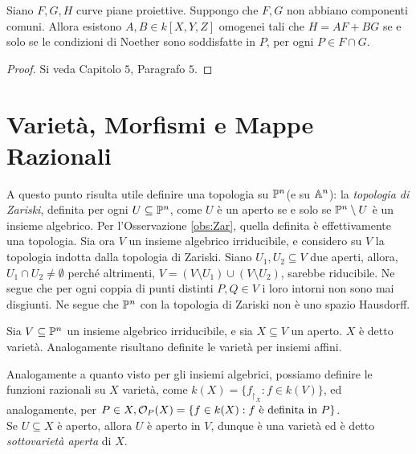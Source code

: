             \begin{teorema}
                Siano $F,G,H$ curve piane proiettive. Suppongo che $F,G$ non abbiano componenti comuni. Allora esistono $A,B \in k[X,Y,Z]$ omogenei tali che $H = AF + BG$ se e solo se le condizioni di Noether 
                sono soddisfatte in $P$, per ogni $P \in F \cap G$. 
            \end{teorema}
            \begin{proof}
                Si veda \cite{fulton} Capitolo $5$, Paragrafo $5$.
            \end{proof}

    \newpage
    \section{Varietà, Morfismi e Mappe Razionali}
        A questo punto risulta utile definire una topologia su $\P^n$(e su $\A^n$): la \emph{topologia di Zariski}, definita per ogni $U \subseteq \P^n$, come $U$ è un aperto se e solo se 
        $\P^n \setminus U$ è un insieme algebrico. Per l'Osservazione \ref{obs:Zar}, quella definita è effettivamente una topologia. 
        Sia ora $V$ un insieme algebrico irriducibile, e considero su $V$ la topologia indotta dalla topologia di Zariski. Siano $U_1,U_2 \subseteq V$ due aperti, allora, $U_1 
        \cap U_2 \neq \emptyset$ perché altrimenti, $V = (V \setminus U_1) \cup (V \setminus U_2)$, sarebbe riducibile. Ne segue che per ogni coppia di punti distinti $P,Q \in 
        V$ i loro intorni non sono mai disgiunti. Ne segue che $\P^n$ con la topologia di Zariski non è uno spazio Hausdorff.\\
        \begin{definizione}
            Sia $V \subseteq \P^n$ un insieme algebrico irriducibile, e sia $X \subseteq V$ un aperto. $X$ è detto varietà. Analogamente risultano definite le varietà per insiemi affini. %
        \end{definizione}
        Analogamente a quanto visto per gli insiemi algebrici, possiamo definire le funzioni razionali su $X$ varietà, come $k(X) = \{f_{\restriction_X} : f \in k(V)\}$, ed analogamente, 
        per $P \in X, \cO_P(X) = \{f \in k(X) : f \text{ è definita in } P\}$.\\
        Se $U \subseteq X$ è aperto, allora $U$ è aperto in $V$, dunque è una varietà ed è detto \emph{sottovarietà aperta} di $X$.\\
